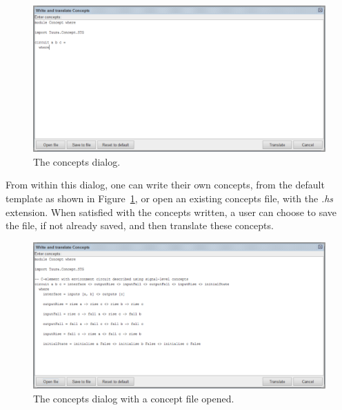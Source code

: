 \documentclass{proc}
\begin{document}
\begin{figure}[H]
\begin{centering}
\includegraphics[scale=0.4]{images/concepts_dialog_screenshot}
\par\end{centering}

\begin{centering}
\protect\caption{\label{fig:concepts_dialog_screenshot}The concepts dialog.}

\par\end{centering}

\end{figure}

From within this dialog, one can write their own concepts, from the default template as shown in Figure~\ref{fig:concepts_dialog_screenshot}, or open an existing concepts file, with the  
\emph{.hs} extension. When satisfied with the concepts written, a user can choose to save the file, if not already saved, and then translate these concepts.

\begin{figure}[H]
\begin{centering}
\includegraphics[scale=0.4]{images/concepts_dialog_Celement}
\par\end{centering}

\begin{centering}
\protect\caption{\label{fig:concepts_dialog_Celement}The concepts dialog with a concept file opened.}

\par\end{centering}

\end{figure}
\end{document}
